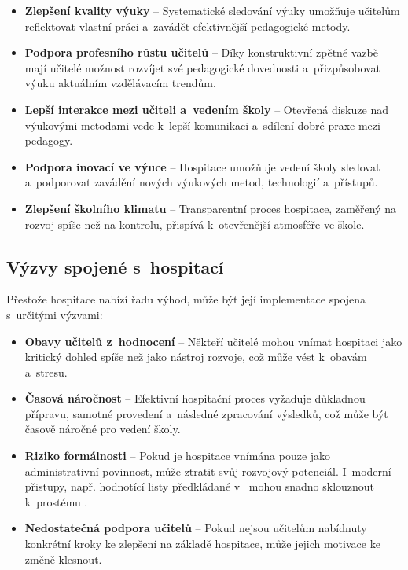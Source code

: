 \begin{itemize}
    \item \textbf{Zlepšení kvality výuky} – Systematické sledování výuky umožňuje učitelům reflektovat vlastní práci a~zavádět efektivnější pedagogické metody.
    \item \textbf{Podpora profesního růstu učitelů} – Díky konstruktivní zpětné vazbě mají učitelé možnost rozvíjet své pedagogické dovednosti a~přizpůsobovat výuku aktuálním vzdělávacím trendům.
    \item \textbf{Lepší interakce mezi učiteli a~vedením školy} – Otevřená diskuze nad výukovými metodami vede k~lepší komunikaci a~sdílení dobré praxe mezi pedagogy.
    \item \textbf{Podpora inovací ve výuce} – Hospitace umožňuje vedení školy sledovat a~podporovat zavádění nových výukových metod, technologií a~přístupů.
    \item \textbf{Zlepšení školního klimatu} – Transparentní proces hospitace, zaměřený na rozvoj spíše než na kontrolu, přispívá k~otevřenější atmosféře ve škole.
\end{itemize}

\subsection{Výzvy spojené s~hospitací}

Přestože hospitace nabízí řadu výhod, může být její implementace spojena s~určitými výzvami:

\begin{itemize}
    \item \textbf{Obavy učitelů z~hodnocení} – Někteří učitelé mohou vnímat hospitaci jako kritický dohled spíše než jako nástroj rozvoje, což může vést k~obavám a~stresu.
    \item \textbf{Časová náročnost} – Efektivní hospitační proces vyžaduje důkladnou přípravu, samotné provedení a~následné zpracování výsledků, což může být časově náročné pro vedení školy.
    \item \textbf{Riziko formálnosti} – Pokud je hospitace vnímána pouze jako administrativní povinnost, může ztratit svůj rozvojový potenciál. I~moderní přistupy, např. hodnotící listy předkládané v~\cite{hospitace-prostredek} mohou snadno sklouznout k~prostému .
    \item \textbf{Nedostatečná podpora učitelů} – Pokud nejsou učitelům nabídnuty konkrétní kroky ke zlepšení na základě hospitace, může jejich motivace ke změně klesnout.
\end{itemize}

